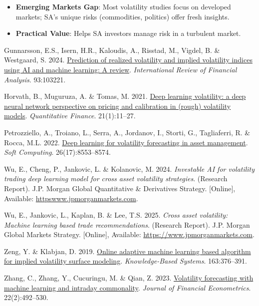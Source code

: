 \documentclass[11pt,preprint]{elsarticle}
\numberwithin{equation}{section}
\numberwithin{figure}{section}
\numberwithin{table}{section}
\def\tightlist{} %
\newlength{\cslhangindent}
\newenvironment{CSLReferences}[2] %
{\begin{list}{}{%
	\setlength{\itemindent}{0pt}
	\setlength{\leftmargin}{0pt}
	\setlength{\parsep}{0pt}
	\ifodd #1
	\setlength{\leftmargin}{\cslhangindent}
	\setlength{\itemindent}{-1\cslhangindent}
	\fi
	\setlength{\itemsep}{#2\baselineskip}}}
{\end{list}}
\begin{document}
\begin{itemize}
\tightlist
\item
  \textbf{Emerging Markets Gap}: Most volatility studies focus on
  developed markets; SA's unique risks (commodities, politics) offer
  fresh insights.\\
\item
  \textbf{Practical Value}: Helps SA investors manage risk in a
  turbulent market.
\end{itemize}

\label{refs}
\begin{CSLReferences}{1}{1}
Gunnarsson, E.S., Isern, H.R., Kaloudis, A., Risstad, M., Vigdel, B. \&
Westgaard, S. 2024.
\href{https://doi.org/10.1016/j.irfa.2024.103221}{Prediction of realized
volatility and implied volatility indices using AI and machine learning:
A review}. \emph{International Review of Financial Analysis}. 93:103221.

Horvath, B., Muguruza, A. \& Tomas, M. 2021.
\href{https://doi.org/10.1080/14697688.2020.1817974}{{Deep learning
volatility: a deep neural network perspective on pricing and calibration
in (rough) volatility models}}. \emph{Quantitative Finance}.
21(1):11--27.

Petrozziello, A., Troiano, L., Serra, A., Jordanov, I., Storti, G.,
Tagliaferri, R. \& Rocca, M.L. 2022.
\href{https://doi.org/10.1007/s00500-022-07161-1}{Deep learning for
volatility forecasting in asset management}. \emph{Soft Computing}.
26(17):8553--8574.

Wu, E., Cheng, P., Jankovic, L. \& Kolanovic, M. 2024. \emph{Investable
AI for volatility trading deep learning model for cross asset volatility
strategies}. (Research Report). J.P. Morgan Global Quantitative \&
Derivatives Strategy. {[}Online{]}, Available:
\href{https://httpswww.jpmorganmarkets.com}{httpswww.jpmorganmarkets.com}.

Wu, E., Jankovic, L., Kaplan, B. \& Lee, T.S. 2025. \emph{Cross asset
volatility: Machine learning based trade recommendations}. (Research
Report). J.P. Morgan Global Markets Strategy. {[}Online{]}, Available:
\url{https://www.jpmorganmarkets.com}.

Zeng, Y. \& Klabjan, D. 2019.
\href{https://doi.org/10.1016/j.knosys.2018.08.039}{Online adaptive
machine learning based algorithm for implied volatility surface
modeling}. \emph{Knowledge-Based Systems}. 163:376--391.

Zhang, C., Zhang, Y., Cucuringu, M. \& Qian, Z. 2023.
\href{https://doi.org/10.1093/jjfinec/nbad005}{Volatility forecasting
with machine learning and intraday commonality}. \emph{Journal of
Financial Econometrics}. 22(2):492--530.

\end{CSLReferences}


\end{document}
